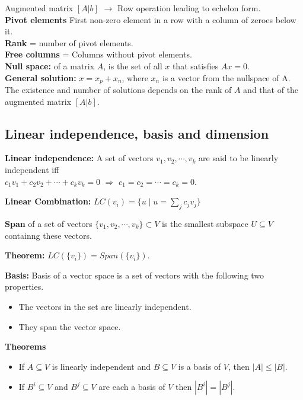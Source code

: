 Augmented matrix $[A|b]$ $\rightarrow$ Row operation leading to echelon form.\\
\textbf{Pivot elements} First non-zero element in a row with a column of zeroes below it.\\
\textbf{Rank} = number of pivot elements.\\
\textbf{Free columns} = Columns without pivot elements.\\
\textbf{Null space:} of a matrix $A$, is the set of all $x$ that satisfies $Ax = 0$.\\
\textbf{General solution:} $x = x_p + x_n$, where $x_n$ is a vector from the nullspace of A.\\
The existence and number of solutions depends on the rank of $A$ and that of the augmented matrix $[A|b]$.\\


\subsection{Linear independence, basis and dimension}

\textbf{Linear independence:} A set of vectors $v_1, v_2, \cdots, v_k$ are said to be linearly independent iff\\
$c_1v_1 + c_2v_2 + \cdots + c_kv_k = 0$ $\Rightarrow$ $c_1 = c_2 = \cdots = c_k = 0$.

\textbf{Linear Combination:} $LC(v_i) = \{u \mid u = \sum_j c_jv_j\}$


\textbf{Span} of a set of vectors $\{v_1, v_2, \cdots, v_k\} \subset V$ 
is the smallest subspace $U \subseteq V$ containng these vectors.

\begin{mdframed}[backgroundcolor=SlateGray2!40,linecolor=Firebrick4]
\textbf{Theorem:} $LC(\{v_i\}) = Span(\{v_i\})$.
\end{mdframed}

\textbf{Basis:} Basis of a vector space is a set of vectors with the following 
                two properties.\\
\begin{itemize}
    \setlength{\itemsep}{-0.5em}
	\item The vectors in the set are linearly independent.
	\item They span the vector space.
\end{itemize}

\begin{mdframed}[backgroundcolor=SlateGray2!40,linecolor=Firebrick4]
\textbf{Theorems}
\begin{itemize}
\item If $A \subseteq V$ is linearly independent and $B \subseteq V$ is a basis
        of $V$, then $|A| \leq |B|$.
\item If $B^i \subseteq V$ and $B^j \subseteq V$ are each a basis of $V$ then 
        $|B^i| = |B^j|$.
\end{itemize}
\end{mdframed}

